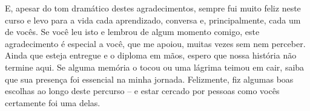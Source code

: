 \begin{agradecimentos}
    E, apesar do tom dramático destes agradecimentos, sempre fui muito feliz neste curso e levo para a vida cada aprendizado, conversa e, principalmente, cada um de vocês. Se você leu isto e lembrou de algum momento comigo, este agradecimento é especial a você, que me apoiou, muitas vezes sem nem perceber. Ainda que esteja entregue e o diploma em mãos, espero que nossa história não termine aqui. Se alguma memória o tocou ou uma lágrima teimou em cair, saiba que sua presença foi essencial na minha jornada. Felizmente, fiz algumas boas escolhas ao longo deste percurso – e estar cercado por pessoas como vocês certamente foi uma delas.


\end{agradecimentos}

